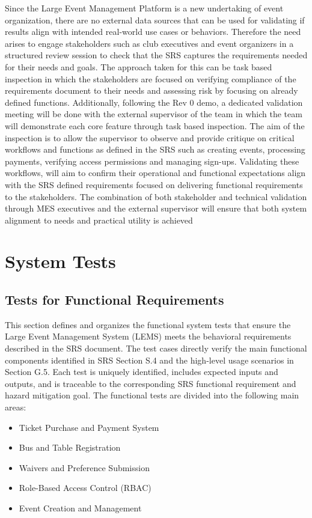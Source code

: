 \documentclass[12pt, titlepage]{article}
\begin{document}
Since the Large Event Management Platform is a new undertaking of event organization, there are no external data sources that can be used for validating if results align with intended real-world use cases or behaviors. Therefore the need arises to engage stakeholders such as club executives and event organizers in a structured review session to check that the SRS captures the requirements needed for their needs and goals. The approach taken for this can be task based inspection in which the stakeholders are focused on verifying compliance of the requirements document to their needs and assessing risk by focusing on already defined functions. Additionally, following the Rev 0 demo, a dedicated validation meeting will be done with the external supervisor of the team in which the team will demonstrate each core feature through task based inspection. The aim of the inspection is to allow the supervisor to observe and provide critique on critical workflows and functions as defined in the SRS such as creating events, processing payments, verifying access permissions and managing sign-ups. Validating these workflows, will aim to confirm their operational and functional expectations align with the SRS defined requirements focused on delivering functional requirements to the stakeholders. The combination of both stakeholder and technical validation through MES executives and the external supervisor will ensure that both system alignment to needs and practical utility is achieved


\section{System Tests}


\subsection{Tests for Functional Requirements}

This section defines and organizes the functional system tests that ensure the Large Event Management System (LEMS) meets the behavioral requirements described in the SRS document. The test cases directly verify the main functional components identified in SRS Section S.4 and the high-level usage scenarios in Section G.5.  
Each test is uniquely identified, includes expected inputs and outputs, and is traceable to the corresponding SRS functional requirement and hazard mitigation goal.\newline \newline
The functional tests are divided into the following main areas:
\begin{itemize}
    \item Ticket Purchase and Payment System
    \item Bus and Table Registration
    \item Waivers and Preference Submission
    \item Role-Based Access Control (RBAC)
    \item Event Creation and Management
\end{itemize}
\end{document}
